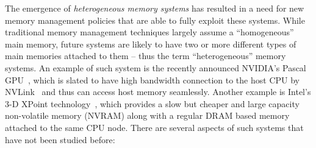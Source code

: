 %
%
%
The emergence of {\it heterogeneous memory systems} has resulted in a need for
new memory management policies that are able to fully exploit these systems.
While traditional memory management techniques largely assume a ``homogeneous''
main memory, future systems are likely to have two or more different types of
main memories attached to them -- thus the term ``heterogeneous'' memory
systems. An example of such system is the recently announced NVIDIA's Pascal
GPU~\cite{pascal}, which is slated to have high bandwidth connection to the host
CPU by NVLink~\cite{NVLINK} and thus can access host memory seamlessly.  Another
example is Intel's 3-D XPoint technology~\cite{xpoint}, which provides a slow
but cheaper and large capacity non-volatile memory (NVRAM) along with a regular
DRAM based memory attached to the same CPU node.  There are several aspects of
such systems that have not been studied before:

